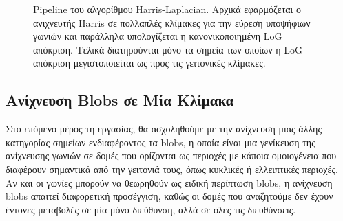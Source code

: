 \documentclass[12pt, a4paper]{article}
\begin{document}
\begin{figure}[H]
{%
  }                                                                                                                                                         
  \caption{Pipeline του αλγορίθμου Harris-Laplacian. Αρχικά εφαρμόζεται ο ανιχνευτής Harris σε πολλαπλές κλίμακες για την εύρεση υποψήφιων γωνιών και παράλληλα υπολογίζεται η
  κανονικοποιημένη LoG απόκριση. Τελικά διατηρούνται μόνο τα σημεία των οποίων η LoG απόκριση μεγιστοποιείται ως προς τις γειτονικές κλίμακες.}                               
  \label{fig:harris_laplace_pipeline}                                                                                                                                         
  \end{figure}

\subsection{Ανίχνευση Blobs σε Μία Κλίμακα}

Στο επόμενο μέρος τη εργασίας, θα ασχοληθούμε με την ανίχνευση μιας άλλης κατηγορίας σημείων ενδιαφέροντος τα blobs, η οποία είναι μια γενίκευση της ανίχνευσης γωνιών σε δομές που ορίζονται ως περιοχές με κάποια ομοιογένεια που διαφέρουν σημαντικά από την
γειτονιά τους, όπως κυκλικές ή ελλειπτικές περιοχές. Αν και οι γωνίες μπορούν να θεωρηθούν ως ειδική περίπτωση blobs, η ανίχνευση blobs απαιτεί διαφορετική προσέγγιση, καθώς οι δομές που αναζητούμε δεν έχουν έντονες μεταβολές σε μία μόνο διεύθυνση, αλλά σε όλες τις διευθύνσεις.
\end{document}
